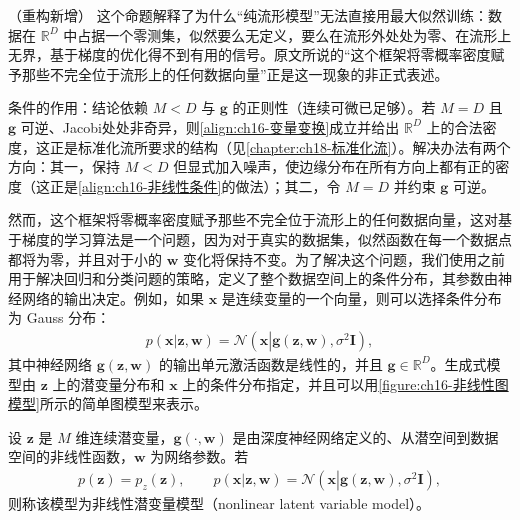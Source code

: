 \documentclass[../../main.tex]{subfiles}
\begin{document}
\begin{remark}（重构新增）
这个命题解释了为什么“纯流形模型”无法直接用最大似然训练：数据在 $\mathbb{R}^{D}$ 中占据一个零测集，似然要么无定义，要么在流形外处处为零、在流形上无界，基于梯度的优化得不到有用的信号。原文所说的“这个框架将零概率密度赋予那些不完全位于流形上的任何数据向量”正是这一现象的非正式表述。

条件的作用：结论依赖 $M<D$ 与 $\bm{g}$ 的正则性（连续可微已足够）。若 $M=D$ 且 $\bm{g}$ 可逆、Jacobi处处非奇异，则\eqref{align:ch16-变量变换}成立并给出 $\mathbb{R}^{D}$ 上的合法密度，这正是标准化流所要求的结构（见\cref{chapter:ch18-标准化流}）。解决办法有两个方向：其一，保持 $M<D$ 但显式加入噪声，使边缘分布在所有方向上都有正的密度（这正是\eqref{align:ch16-非线性条件}的做法）；其二，令 $M=D$ 并约束 $\bm{g}$ 可逆。
\end{remark}

然而，这个框架将零概率密度赋予那些不完全位于流形上的任何数据向量，这对基于梯度的学习算法是一个问题，因为对于真实的数据集，似然函数在每一个数据点都将为零，并且对于小的 $\bm{w}$ 变化将保持不变。为了解决这个问题，我们使用之前用于解决回归和分类问题的策略，定义了整个数据空间上的条件分布，其参数由神经网络的输出决定。例如，如果 $\bm{x}$ 是连续变量的一个向量，则可以选择条件分布为 Gauss 分布：
\begin{align}
  p(\bm{x}|\bm{z},\bm{w})=\mathcal{N}\left(\bm{x}\left|\bm{g}(\bm{z},\bm{w}),\sigma^2\bm{I}\right.\right),
  \label{align:ch16-非线性条件}
\end{align}
其中神经网络 $\bm{g}(\bm{z},\bm{w})$ 的输出单元激活函数是线性的，并且 $\bm{g}\in\mathbb{R}^{D}$。生成式模型由 $\bm{z}$ 上的潜变量分布和 $\bm{x}$ 上的条件分布指定，并且可以用\cref{figure:ch16-非线性图模型}所示的简单图模型来表示。

\begin{definition}[非线性潜变量模型]\label{definition:ch16-非线性潜变量模型}
设 $\bm{z}$ 是 $M$ 维连续潜变量，$\bm{g}(\cdot,\bm{w})$ 是由深度神经网络定义的、从潜空间到数据空间的非线性函数，$\bm{w}$ 为网络参数。若
\begin{align*}
  p(\bm{z})=p_z(\bm{z}),\qquad
  p(\bm{x}|\bm{z},\bm{w})=\mathcal{N}\left(\bm{x}\left|\bm{g}(\bm{z},\bm{w}),\sigma^2\bm{I}\right.\right),
\end{align*}
则称该模型为非线性潜变量模型（nonlinear latent variable model）。
\end{definition}
\end{document}
